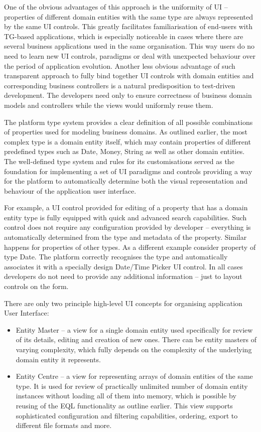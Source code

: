   One of the obvious advantages of this approach is the uniformity of UI -- properties of different domain entities with the same type are always represented by the same UI controls.
  This greatly facilitates familiarisation of end-users with TG-based applications, which is especially noticeable in cases where there are several business applications used in the same organisation.
  This way users do no need to learn new UI controls, paradigms or deal with unexpected behaviour over the period of application evolution.
  Another less obvious advantage of such transparent approach to fully bind together UI controls with domain entities and corresponding business controllers is a natural predisposition to test-driven development.
  The developers need only to ensure correctness of business domain models and controllers while the views would uniformly reuse them.

  The platform type system provides a clear definition of all possible combinations of properties used for modeling business domains.
  As outlined earlier, the most complex type is a domain entity itself, which may contain properties of different predefined types such as Date, Money, String as well as other domain entities.
  The well-defined type system and rules for its customisations served as the foundation for implementing a set of UI paradigms and controls providing a way for the platform to automatically determine both the visual representation and behaviour of the application user interface.
    
  For example, a UI control provided for editing of a property that has a domain entity type is fully equipped with quick and advanced search capabilities.
  Such control does not require any configuration provided by developer -- everything is automatically determined from the type and metadata of the property.
  Similar happens for properties of other types.
  As a different example consider property of type Date.
  The platform correctly recognises the type and automatically associates it with a specially design Date/Time Picker UI control.
  In all cases developers do not need to provide any additional information -- just to layout controls on the form.
  
  There are only two principle high-level UI concepts for organising application User Interface:
  \begin{itemize}
   \item Entity Master -- a view for a single domain entity used specifically for review of its details, editing and creation of new ones.
	 There can be entity masters of varying complexity, which fully depends on the complexity of the underlying domain entity it represents.
    \item Entity Centre -- a view for representing arrays of domain entities of the same type. 
	  It is used for review of practically unlimited number of domain entity instances without loading all of them into memory, which is possible by reusing of the EQL functionality as outline earlier.
	  This view supports sophisticated configuration and filtering capabilities, ordering, export to different file formats and more.
  \end{itemize}
  
